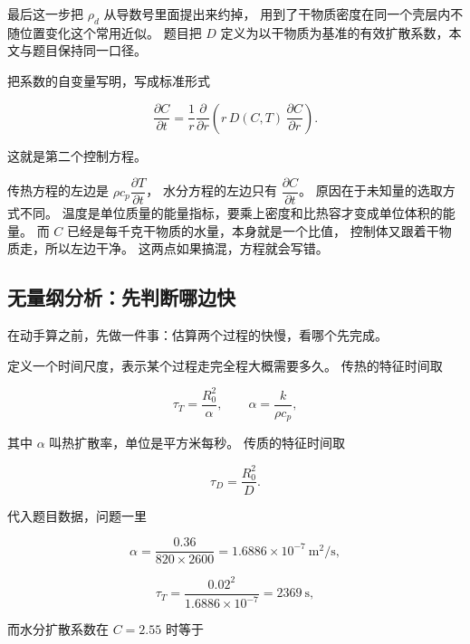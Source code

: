 最后这一步把 $\rho_d$ 从导数号里面提出来约掉，
用到了干物质密度在同一个壳层内不随位置变化这个常用近似。
题目把 $D$ 定义为以干物质为基准的有效扩散系数，本文与题目保持同一口径。

把系数的自变量写明，写成标准形式

\begin{equation}
\boxed{\;
\frac{\partial C}{\partial t}
= \frac{1}{r}\frac{\partial}{\partial r}\left(r\,D(C,T)\,\frac{\partial C}{\partial r}\right).
\;}
\label{eq:mass}
\end{equation}

这就是第二个控制方程。

传热方程的左边是 $\rho c_p\dfrac{\partial T}{\partial t}$，
水分方程的左边只有 $\dfrac{\partial C}{\partial t}$。
原因在于未知量的选取方式不同。
温度是单位质量的能量指标，要乘上密度和比热容才变成单位体积的能量。
而 $C$ 已经是每千克干物质的水量，本身就是一个比值，
控制体又跟着干物质走，所以左边干净。
这两点如果搞混，方程就会写错。

\subsection{无量纲分析：先判断哪边快}

在动手算之前，先做一件事：估算两个过程的快慢，看哪个先完成。

定义一个时间尺度，表示某个过程走完全程大概需要多久。
传热的特征时间取

\begin{equation}
\tau_T = \frac{R_0^2}{\alpha}, \qquad \alpha = \frac{k}{\rho c_p},
\end{equation}

其中 $\alpha$ 叫热扩散率，单位是平方米每秒。
传质的特征时间取

\begin{equation}
\tau_D = \frac{R_0^2}{D}.
\end{equation}

代入题目数据，问题一里

\begin{equation}
\alpha = \frac{0.36}{820\times2600} = 1.6886\times10^{-7}\ \mathrm{m^2/s},
\end{equation}

\begin{equation}
\tau_T = \frac{0.02^2}{1.6886\times10^{-7}} = 2369\ \mathrm{s},
\end{equation}

而水分扩散系数在 $C=2.55$ 时等于

